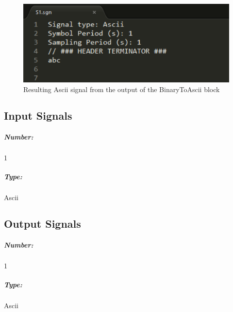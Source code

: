 \begin{figure}[h]
	\centering
\includegraphics[width=.7\linewidth]{./lib/ascii_to_binary/figures/ascii_signal.png}
\caption{Resulting Ascii signal from the output of the BinaryToAscii block}\label{AsciiSignalImage}
\end{figure}

\pagebreak

\subsection*{Input Signals}

\subparagraph*{Number:} 1

\subparagraph*{Type:} Ascii

\subsection*{Output Signals}

\subparagraph*{Number:} 1

\subparagraph*{Type:} Ascii 